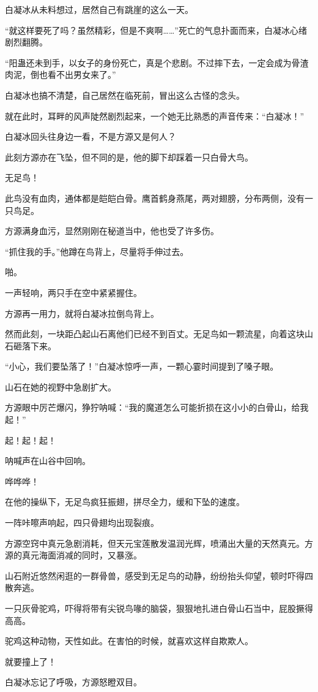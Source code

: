 \begin{this_body}
白凝冰从未料想过，居然自己有跳崖的这么一天。

“就这样要死了吗？虽然精彩，但是不爽啊……”死亡的气息扑面而来，白凝冰心绪剧烈翻腾。

“阳蛊还未到手，以女子的身份死亡，真是个悲剧。不过摔下去，一定会成为骨渣肉泥，倒也看不出男女来了。”

白凝冰也搞不清楚，自己居然在临死前，冒出这么古怪的念头。

就在此时，耳畔的风声陡然剧烈起来，一个她无比熟悉的声音传来：“白凝冰！”

白凝冰回头往身边一看，不是方源又是何人？

此刻方源亦在飞坠，但不同的是，他的脚下却踩着一只白骨大鸟。

无足鸟！

此鸟没有血肉，通体都是皑皑白骨。鹰首鹤身燕尾，两对翅膀，分布两侧，没有一只鸟足。

方源满身血污，显然刚刚在秘道当中，他也受了许多伤。

“抓住我的手。”他蹲在鸟背上，尽量将手伸过去。

啪。

一声轻响，两只手在空中紧紧握住。

方源再一用力，就将白凝冰拉倒鸟背上。

然而此刻，一块距凸起山石离他们已经不到百丈。无足鸟如一颗流星，向着这块山石砸落下来。

“小心，我们要坠落了！”白凝冰惊呼一声，一颗心霎时间提到了嗓子眼。

山石在她的视野中急剧扩大。

方源眼中厉芒爆闪，狰狞呐喊：“我的魔道怎么可能折损在这小小的白骨山，给我起！”

起！起！起！

呐喊声在山谷中回响。

哗哗哗！

在他的操纵下，无足鸟疯狂振翅，拼尽全力，缓和下坠的速度。

一阵咔嚓声响起，四只骨翅均出现裂痕。

方源空窍中真元急剧消耗，但天元宝莲散发温润光辉，喷涌出大量的天然真元。方源的真元海面消减的同时，又暴涨。

山石附近悠然闲逛的一群骨兽，感受到无足鸟的动静，纷纷抬头仰望，顿时吓得四散奔逃。

一只灰骨驼鸡，吓得将带有尖锐鸟喙的脑袋，狠狠地扎进白骨山石当中，屁股撅得高高。

驼鸡这种动物，天性如此。在害怕的时候，就喜欢这样自欺欺人。

就要撞上了！

白凝冰忘记了呼吸，方源怒瞪双目。


\end{this_body}
